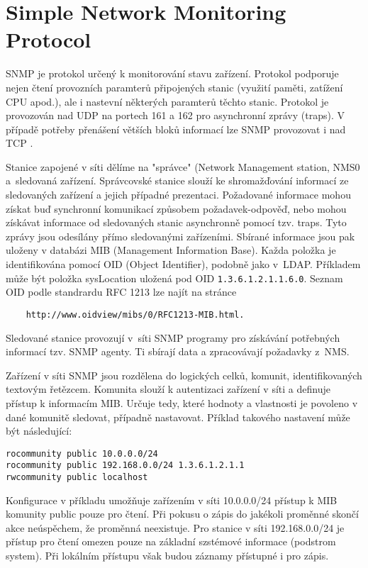 \section{Simple Network Monitoring Protocol}
\label{snmp}

SNMP \cite{rfc1157} je protokol určený k monitorování stavu zařízení. Protokol podporuje nejen čtení
 provozních paramterů připojených stanic (využití paměti, zatížení CPU apod.), ale i nastevní
 některých paramterů těchto stanic.
Protokol je provozován nad UDP na portech 161 a 162 pro asynchronní zprávy (traps). V případě
 potřeby přenášení větších bloků informací lze SNMP provozovat i nad TCP \cite{rfc3430}.

Stanice zapojené v síti dělíme na "správce" (Network Management station, NMS0 a~sledovaná zařízení.
 Správcovské stanice slouží ke shromažďování informací ze sledovaných zařízení a jejich případné prezentaci.
Požadované informace mohou získat buď synchronní komunikací způsobem požadavek-odpověď, nebo mohou
 získávat informace od sledovaných stanic asynchronně pomocí tzv. traps. Tyto zprávy jsou odesílány
 přímo sledovanými zařízeními. Sbírané informace jsou pak uloženy v databázi MIB
 (Management Information Base). Každa položka je identifikována pomocí OID (Object Identifier),
 podobně jako v~LDAP. Příkladem může být položka sysLocation uložená pod OID {\tt 1.3.6.1.2.1.1.6.0}.
 Seznam OID podle standrardu RFC 1213 \cite{rfc1213} lze najít na stránce
\begin{verbatim}
    http://www.oidview/mibs/0/RFC1213-MIB.html.
\end{verbatim}

Sledované stanice provozují v~síti SNMP programy pro získávání potřebných informací tzv. SNMP agenty.
 Ti sbírají data a zpracovávají požadavky z~NMS.

Zařízení v síti SNMP jsou rozdělena do logických celků, komunit, identifikovaných textovým
 řetězcem. Komunita slouží k autentizaci zařízení v síti a definuje přístup k informacím MIB.
 Určuje tedy, které hodnoty a vlastnosti je povoleno v dané komunitě sledovat, případně nastavovat.
 Příklad takového nastavení může být následující: 
\begin{verbatim}
rocommunity public 10.0.0.0/24
rocommunity public 192.168.0.0/24 1.3.6.1.2.1.1
rwcommunity public localhost
\end{verbatim}
Konfigurace v příkladu umožňuje zařízením v síti 10.0.0.0/24 přístup k MIB komunity public pouze
 pro čtení. Při pokusu o zápis do jakékoli proměnné skončí akce neúspěchem, že proměnná neexistuje.
 Pro stanice v síti 192.168.0.0/24 je přístup pro čtení omezen pouze na základní szstémové informace
 (podstrom system). Při lokálním přístupu však budou záznamy přístupné i pro zápis.

